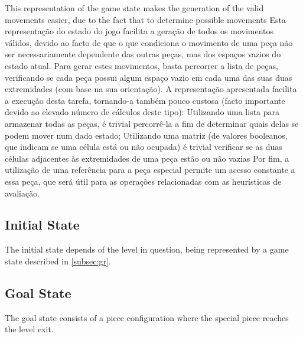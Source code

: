 \documentclass[conference]{IEEEtran}
\begin{document}
This representation of the game state makes the generation of the valid movements easier, due to the fact that to determine possible movements 
Esta representação do estado do jogo facilita a geração de todos os movimentos válidos, devido ao facto de que o que condiciona o movimento de uma peça não ser necessariamente dependente das outras peças, mas dos espaços vazios do estado atual. Para gerar estes movimentos, basta percorrer a lista de peças, verificando se cada peça possui algum espaço vazio em cada uma das suas duas extremidades (com base na sua orientação). A representação apresentada facilita a execução desta tarefa, tornando-a também pouco custosa (facto importante devido ao elevado número de cálculos deste tipo):
Utilizando uma lista para armazenar todas as peças, é trivial percorrê-la a fim de determinar quais delas se podem mover num dado estado;
Utilizando uma matriz (de valores booleanos, que indicam se uma célula está ou não ocupada) é trivial verificar se as duas células adjacentes às extremidades de uma peça estão ou não vazias
Por fim, a utilização de uma referência para a peça especial permite um acesso constante a essa peça, que será útil para as operações relacionadas com as heurísticas de avaliação.

\subsection{Initial State}
The initial state depends of the level in question, being represented by a game state described in \autoref{subsec:gr}.

\subsection{Goal State}
The goal state consists of a piece configuration where the special piece reaches the level exit.
\end{document}
